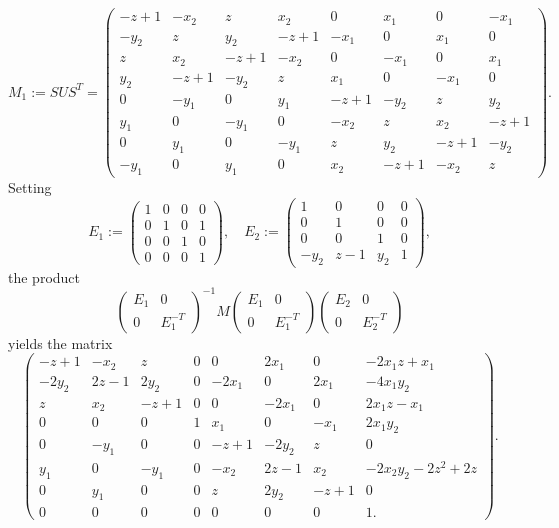 \documentclass[11pt,leqno]{article}
\renewcommand{\1}{{\rm 1\hspace*{-0.4ex}%
\rule{0.1ex}{1.52ex}\hspace*{0.2ex}}}
\newcommand{\<}[1]{{\langle}#1 {\rangle}}
\theoremstyle{plain}
\theoremstyle{definition}
\theoremstyle{remark}
\numberwithin{equation}{section}
\begin{document}
\begin{equation*}
    M_1 := SUS^T = \begin{pmatrix}
        
    -z+1& -x_2& z& x_2& 0& x_1& 0& -x_1\\ -y_2& z& y_2& -z+1& -x_1& 0& x_1& 0\\ z& x_2& -z+1& -x_2& 0& -x_1& 0& x_1\\ y_2& -z+1& -y_2& z& x_1& 0& -x_1& 0\\ 0& -y_1& 0& y_1& -z+1& -y_2& z& y_2\\ y_1& 0& -y_1& 0& -x_2& z& x_2& -z+1\\ 0& y_1& 0& -y_1& z& y_2& -z+1& -y_2\\ -y_1& 0& y_1& 0& x_2& -z+1& -x_2& z \end{pmatrix}.
\end{equation*}
Setting
\begin{equation*}
    E_1 := \begin{pmatrix}
        1&0&0&0\\0&1&0&1\\0&0&1&0\\0&0&0&1
    \end{pmatrix}, \quad E_2 := \begin{pmatrix}
        1& 0& 0& 0\\ 0& 1& 0& 0\\ 0& 0& 1& 0\\ -y_2& z-1& y_2& 1
    \end{pmatrix},
\end{equation*}
the product 
\begin{equation*}
    \begin{pmatrix}
        E_1 & 0 \\ 0 & E_1^{-T}
    \end{pmatrix}^{-1}M\begin{pmatrix}
        E_1 & 0 \\ 0 & E_1^{-T}
    \end{pmatrix} \begin{pmatrix}
        E_2 & 0 \\ 0 & E_2^{-T} 
    \end{pmatrix}
\end{equation*}
yields the matrix 
\begin{equation*}
    \begin{pmatrix}
        -z+1& -x_2& z& 0& 0& 2x_1& 0& -2x_1z+x_1\\ -2y_2& 2z-1& 2y_2& 0& -2x_1& 0& 2x_1& -4x_1y_2\\ z& x_2& -z+1& 0& 0& -2x_1& 0& 2x_1z-x_1\\ 0& 0& 0& 1& x_1& 0& -x_1&2x_1y_2\\ 0& -y_1& 0& 0& -z+1& -2y_2& z& 0\\ y_1& 0& -y_1& 0& -x_2& 2z-1& x_2& -2x_2y_2-2z^2+2z\\ 0& y_1& 0& 0& z& 2y_2& -z+1& 0\\ 0& 0& 0& 0& 0& 0& 0& 1

.
    \end{pmatrix}.
\end{equation*}
\end{document}
